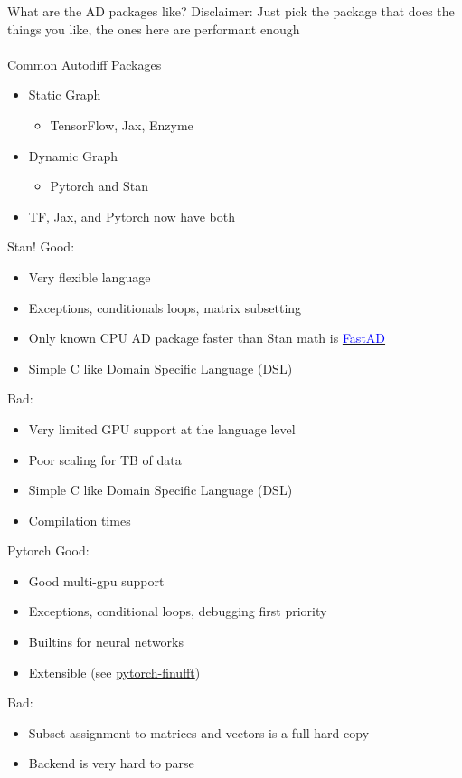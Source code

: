 \documentclass[dvipsnames]{beamer}
\begin{document}
\begin{frame}{What are the AD packages like?}
Disclaimer: Just pick the package that does the things you like, the ones here are performant enough\\
\\
Common Autodiff Packages
\begin{itemize}
\item Static Graph
  \begin{itemize}
    \item TensorFlow, Jax, Enzyme
 \end{itemize}
 \item Dynamic Graph
 \begin{itemize}
     \item Pytorch and Stan
 \end{itemize}
 \item TF, Jax, and Pytorch now have both
\end{itemize}
\end{frame}

\begin{frame}{Stan!}
Good:
\begin{itemize}
    \item Very flexible language
    \item Exceptions, conditionals loops, matrix subsetting
    \item Only known CPU AD package faster than Stan math is \href{https://godbolt.org/z/6PG475K1W}{\textcolor{blue}{FastAD}}
    \item Simple C like Domain Specific Language (DSL)
\end{itemize}
Bad:
\begin{itemize}
    \item Very limited GPU support at the language level
    \item Poor scaling for TB of data
    \item Simple C like Domain Specific Language (DSL)
    \item Compilation times
\end{itemize}
\end{frame}

\begin{frame}{Pytorch}
Good:
\begin{itemize}
    \item Good multi-gpu support
    \item Exceptions, conditional loops, debugging first priority
    \item Builtins for neural networks
    \item Extensible (see \href{https://github.com/flatironinstitute/pytorch-finufft}{pytorch-finufft})
\end{itemize}
Bad:
\begin{itemize}
    \item Subset assignment to matrices and vectors is a full hard copy
    \item Backend is very hard to parse
\end{itemize}
\end{frame}
\end{document}
